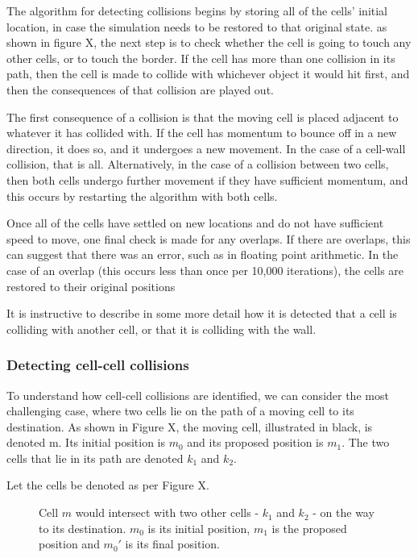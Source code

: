 \documentclass[11.5pt]{article}
\begin{document}
The algorithm for detecting collisions begins by storing all of the 
cells' initial location, in case the simulation needs to be restored to 
that original state. as shown in figure X, the next step is to check 
whether the cell is going to touch any other cells, or to touch the 
border. If the cell has more than one collision in its path, then the 
cell is made to collide with whichever object it would hit first, and 
then the consequences of that collision are played out. 



The first consequence of a collision is that the moving cell is placed 
adjacent to whatever it has collided with. If the cell has momentum to 
bounce off in a new direction, it does so, and it undergoes a new 
movement. In the case of a cell-wall collision, that is all. 
Alternatively, in the case of a collision between two cells, then both 
cells undergo further movement if they have sufficient momentum, and 
this occurs by restarting the algorithm with both cells.



Once all of the cells have settled on new locations and do not have 
sufficient speed to move, one final check is made for any overlaps. If 
there are overlaps, this can suggest that there was an error, such as in 
floating point arithmetic. In the case of an overlap (this occurs less 
than once per 10,000 iterations), the cells are restored to their 
original positions



It is instructive to describe in some more detail how it is detected 
that a cell is colliding with another cell, or that it is colliding with 
the wall.



\subsubsection{Detecting cell-cell 
collisions}
To understand how cell-cell collisions are identified, we can consider 
the most challenging case, where two cells lie on the path of a moving 
cell to its destination. As shown in Figure X, the moving cell, 
illustrated in black, is denoted m. Its initial position is \(m_0\) 
and its proposed position is \(m_1\). The two cells that lie in its 
path are denoted \(k_1\) and \(k_2\).

Let the cells be denoted as per Figure X.

\begin{figure}[H]
\centering
\caption{Cell \(m\) would intersect with two other 
  cells - \(k_1\) and \(k_2\) - on the way to its destination. 
  \(m_0\) is its initial position, \(m_1\) is the proposed position and 
\(m_0'\) is its final position.}
\end{figure}
\end{document}
